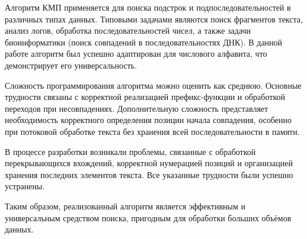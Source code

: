 \documentclass[12pt]{article}
\begin{document}
Алгоритм КМП применяется для поиска подстрок и подпоследовательностей в различных типах данных. Типовыми задачами являются поиск фрагментов текста, анализ логов, обработка последовательностей чисел, а также задачи биоинформатики (поиск совпадений в последовательностях ДНК). В данной работе алгоритм был успешно адаптирован для числового алфавита, что демонстрирует его универсальность.

Сложность программирования алгоритма можно оценить как среднюю. Основные трудности связаны с корректной реализацией префикс-функции и обработкой переходов при несовпадениях. Дополнительную сложность представляет необходимость корректного определения позиции начала совпадения, особенно при потоковой обработке текста без хранения всей последовательности в памяти.

В процессе разработки возникали проблемы, связанные с обработкой перекрывающихся вхождений, корректной нумерацией позиций и организацией хранения последних элементов текста. Все указанные трудности были успешно устранены.

Таким образом, реализованный алгоритм является эффективным и универсальным средством поиска, пригодным для обработки больших объёмов данных.
\end{document}
